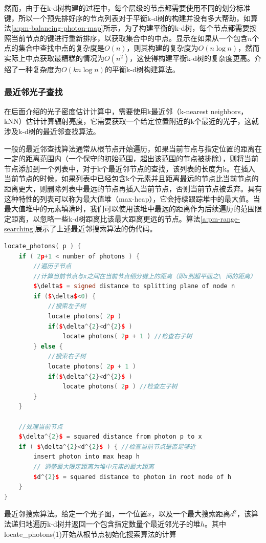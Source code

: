 然而，由于在k-d树构建的过程中，每个层级的节点都需要使用不同的划分标准键，所以一个预先排好序的节点列表对于平衡k-d树的构建并没有多大帮助，如算法\ref{a:pm-balancing-photon-map}所示，为了构建平衡的k-d树，每个节点都需要按照当前节点的键进行重新排序，以获取集合中的中点。\cite{a:MultidimensionalBinarySearchTreesUsedforAssociativeSearching}显示在如果从一个包含$n$个点的集合中查找中点的复杂度是$O(n)$，则其构建的复杂度为$O(n\log n)$，然而实际上中点获取最糟糕的情况为$O(n^2)$，这使得构建平衡k-d树的复杂度更高。\cite{a:BuildingaBalancedkdTreeinOknlognTime}介绍了一种复杂度为$O(kn\log n)$的平衡k-d树构建算法。





\subsubsection{最近邻光子查找}
在后面介绍的光子密度估计计算中，需要使用k最近邻（k-nearest neighbors，kNN）估计计算辐射亮度，它需要获取一个给定位置附近的k个最近的光子，这就涉及k-d树的最近邻查找算法。

一般的最近邻查找算法通常从根节点开始遍历，如果当前节点与指定位置的距离在一定的距离范围内（一个保守的初始范围，超出该范围的节点被排除），则将当前节点添加到一个列表中，对于k个最近邻节点的查找，该列表的长度为k。在插入当前节点的时候，如果列表中已经包含k个元素并且距离最远的节点比当前节点的距离更大，则删除列表中最远的节点再插入当前节点，否则当前节点被丢弃。具有这种特性的列表可以称为最大值堆（max-heap），它会持续跟踪堆中的最大值。当最大值堆中的元素填满时，我们可以使用该堆中最远的距离作为后续遍历的范围限定距离，以忽略一些k-d树距离比该最大距离更远的节点。算法\ref{a:pm-range-searching}\cite{a:APracticalGuidetoGlobalIlluminationusingPhotonMaps}展示了上述最近邻搜索算法的伪代码。

\begin{algorithm}
\begin{lstlisting}[language=C++, mathescape]
locate_photons( p ) {
	if ( 2p+1 < number of photons ) { 
		//遍历子节点
		//计算当前节点与x之间在当前节点细分键上的距离（即x到超平面之\ 间的距离）
		$\delta$ = signed distance to splitting plane of node n 
		if ($\delta$<0) {
			//搜索左子树
			locate photons( 2p ) 
			if($\delta^{2}<d^{2}$ )
				locate photons( 2p + 1 ) //检查右子树 
		} else {
			//搜索右子树
			locate photons( 2p + 1 ) 
			if($\delta^{2}<d^{2}$ )
				locate photons( 2p ) //检查左子树
		}
	}
			
	//处理当前节点
	$\delta^{2}$ = squared distance from photon p to x
	if ( $\delta^{2}<d^{2}$ ) { //检查当前节点是否足够近
		insert photon into max heap h
		// 调整最大限定距离为堆中元素的最大距离
		$d^{2}$ = squared distance to photon in root node of h 
	}
}
\end{lstlisting}
\caption{最近邻搜索算法。给定一个光子图，一个位置$x$，以及一个最大搜索距离$d^{2}$，该算法递归地遍历k-d树并返回一个包含指定数量个最近邻光子的堆$h$。其中locate\_photons(1)开始从根节点初始化搜索算法的计算}
\label{a:pm-range-searching}
\end{algorithm}

